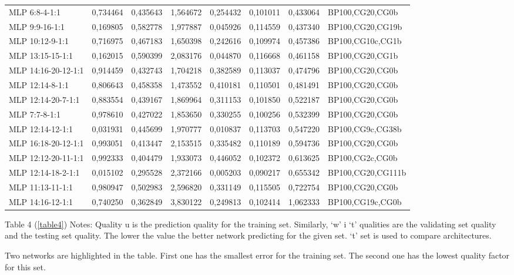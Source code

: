 \documentclass[10pt,oneside]{memoir}
\begin{document}
\begin{table}[htbp]
\begin{minipage}{\linewidth}
\begin{tabulary}{\linewidth}{@{}l@{}l@{}l@{}l@{}l@{}l@{}l@{}l@{}}
MLP 6:8-4-1:1&0,734464&0,435643&1,564672&0,254432&0,101011&0,433064&BP100,CG20,CG0b \\
MLP 9:9-16-1:1&0,169805&0,582778&1,977887&0,045926&0,114559&0,437340&BP100,CG20,CG19b \\
MLP 10:12-9-1:1&0,716975&0,467183&1,650398&0,242616&0,109974&0,457386&BP100,CG10c,CG1b \\
MLP 13:15-15-1:1&0,162015&0,590399&2,083176&0,044870&0,116668&0,461158&BP100,CG20,CG1b \\
MLP 14:16-20-12-1:1&0,914459&0,432743&1,704218&0,382589&0,113037&0,474796&BP100,CG20,CG0b \\
MLP 12:14-8-1:1&0,806643&0,458358&1,473552&0,410181&0,110501&0,481491&BP100,CG20,CG0b \\
MLP 12:14-20-7-1:1&0,883554&0,439167&1,869964&0,311153&0,101850&0,522187&BP100,CG20,CG0b \\
MLP 7:7-8-1:1&0,978610&0,427022&1,853650&0,330255&0,100256&0,532399&BP100,CG20,CG0b \\
MLP 12:14-12-1:1&0,031931&0,445699&1,970777&0,010837&0,113703&0,547220&BP100,CG9c,CG38b \\
MLP 16:18-20-12-1:1&0,993051&0,413447&2,153515&0,335482&0,110189&0,594736&BP100,CG20,CG0b \\
MLP 12:12-20-11-1:1&0,992333&0,404479&1,933073&0,446052&0,102372&0,613625&BP100,CG2c,CG0b \\
MLP 12:14-18-2-1:1&0,015102&0,295528&2,372166&0,005203&0,090217&0,655342&BP100,CG20,CG111b \\
MLP 11:13-11-1:1&0,980947&0,502983&2,596820&0,331149&0,115505&0,722754&BP100,CG20,CG0b \\
MLP 14:16-12-1:1&0,740250&0,362849&3,830122&0,249813&0,102414&1,062333&BP100,CG19c,CG0b \\

		\bottomrule
	\end{tabulary}
\end{minipage}
\end{table}

Table 4 (\autoref{table4}) Notes: Quality u is the prediction quality for the training set. Similarly, `w' i `t' qualities are the validating set quality and the testing set quality. The lower the value the better network predicting for the given set. `t' set is used to compare architectures.


Two networks are highlighted in the table. First one has the smallest error for the training set. The second one has the lowest quality factor for this set.
\end{document}
